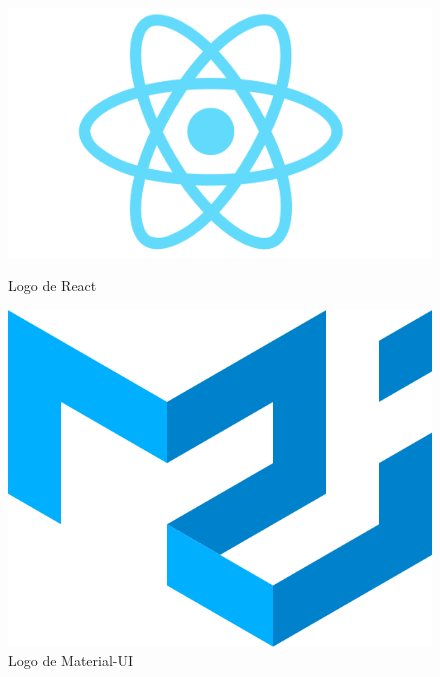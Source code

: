 \begin{figure}[H]
    \centering
    \begin{minipage}{0.3\textwidth}
        \centering
        \includegraphics[width=\textwidth]{figures/7-Construccion/React.png}
        \caption{Logo de React}
    \end{minipage}
    \hfill
    \begin{minipage}{0.3\textwidth}
        \centering
        \includegraphics[width=\textwidth]{figures/7-Construccion/MaterialUI.png}
        \caption{Logo de Material-UI}
    \end{minipage}
\end{figure}


